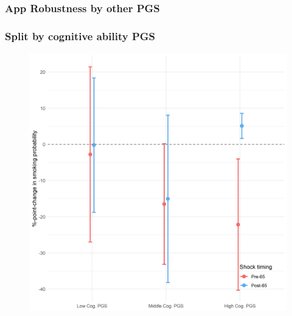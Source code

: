 \documentclass[10pt,compress,xcolor=dvipsnames,aspectratio=169]{beamer}    %
\newcounter{ex}
\newcommand{\1}[1]{\mathrm{1\hspace*{-2.5pt}l}[#1]}	%
\begin{document}
\subsubsection{App Robustness by other PGS}
\begin{frame}
\frametitle{Split by cognitive ability PGS}

\begin{figure}[hbtp]
\centering
\includegraphics[height=0.8\textheight]{../../3_output/shock_effects/robustness_cogPGS_6070_100_cv.png}
\label{fig:cogPGS}
\end{figure}
\hyperlink{frame:otherX}{}
\end{frame}
\end{document}
